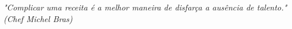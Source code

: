 
\renewcommand{\epigraphname}{EPÍGRAFE}

\begin{epigrafe}

\textit{"Complicar uma receita é a melhor maneira de disfarça a ausência de talento."}\\
\null\hfill \textit{(Chef Michel Bras)}

\end{epigrafe}

